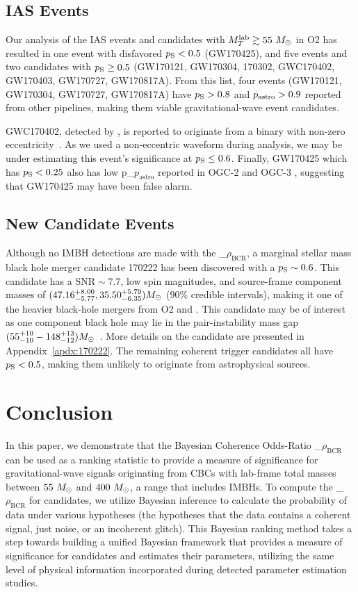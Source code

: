\documentclass[
 nofootinbib,
 amsmath,amssymb,
 aps,
 twocolumn,
 superscriptaddress
]{revtex4-2}
\newcommand{\GWTC}{{\sc {{GWTC-1}}}\xspace}
\newcommand{\fancytext}[1]{{\relax\ifmmode#1\else $#1$\fi}\xspace}
\newcommand{\mathcmd}[1]{{\sc \relax\ifmmode#1\else $#1$\fi}\xspace}
\newcommand{\bcr}{\mathcmd{\rho_\text{BCR}}}
\newcommand{\msun}{\mathcmd{M_\odot}}
\newcommand{\totMlab}{\mathcmd{M_T^{\rm{lab}}}}
\newcommand{\pastro}{\fancytext{p_\text{astro}}}
\newcommand{\pastrobcr}{\fancytext{p_\text{S}}}
\begin{document}
\subsection{IAS Events}
Our analysis of the IAS events and candidates with $\totMlab\gtrsim55~\msun$ in O2 has resulted in one event with disfavored ${\pastrobcr<0.5}$ (GW170425), and five events and two candidates with $\pastrobcr\geq0.5$ (GW170121, GW170304, 170302, GWC170402, GW170403, GW170727, GW170817A). From this list, four events (GW170121, GW170304, GW170727, GW170817A) have ${\pastrobcr>0.8}$ and ${\pastro>0.9}$ reported from other pipelines, making them viable gravitational-wave event candidates.  

GWC170402, detected by \citet{IAS2}, is reported to originate from a binary with non-zero eccentricity~\cite{IAS2}. As we used a non-eccentric waveform during analysis, we may be under estimating this event's significance at ${\pastrobcr\leq0.6}$. Finally, GW170425 which has ${\pastrobcr<0.25}$ also has low \pastro reported in OGC-2 and OGC-3 \cite{pycbc_ogc_2,pycbc_ogc_3}, suggesting that GW170425 may have been false alarm.


\subsection{New Candidate Events}
Although no IMBH detections are made with the \bcr, a marginal stellar mass black hole merger candidate 170222 has been discovered with a ${\pastrobcr\sim0.6}$. This candidate has a ${\text{SNR}\sim7.7}$, low spin magnitudes, and source-frame component masses of ${({47.16}_{-5.77}^{+8.00}, {35.50}_{-6.35}^{+5.79}) \msun}$ ($90\%$ credible intervals), making it one of the heavier black-hole mergers from O2 and \GWTC. This candidate may be of interest as one component black hole may lie in the pair-instability mass gap $({55^{+10}_{-10}-148^{+13}_{-12})\msun}$~\cite{Woosley:2021:arXiv, Heger:2002:ApJ}. More details on the candidate are presented in Appendix~\ref{apdx:170222}. The remaining coherent trigger candidates all have ${\pastrobcr<0.5}$, making them unlikely to originate from astrophysical sources. 

\section{\label{sec:Conclusion}Conclusion}

In this paper, we demonstrate that the Bayesian Coherence Odds-Ratio \bcr~\cite{BCR1} can be used as a ranking statistic to provide a measure of significance for gravitational-wave signals originating from CBCs with lab-frame total masses between $55~\msun$ and $400~\msun$, a range that includes IMBHs. To compute the \bcr for candidates, we utilize Bayesian inference to calculate the probability of data under various hypotheses (the hypotheses that the data contains a coherent signal, just noise, or an incoherent glitch). This Bayesian ranking method takes a step towards building a unified Bayesian framework that provides a measure of significance for candidates and estimates their parameters, utilizing the same level of physical information incorporated during detected parameter estimation studies. 
\end{document}
